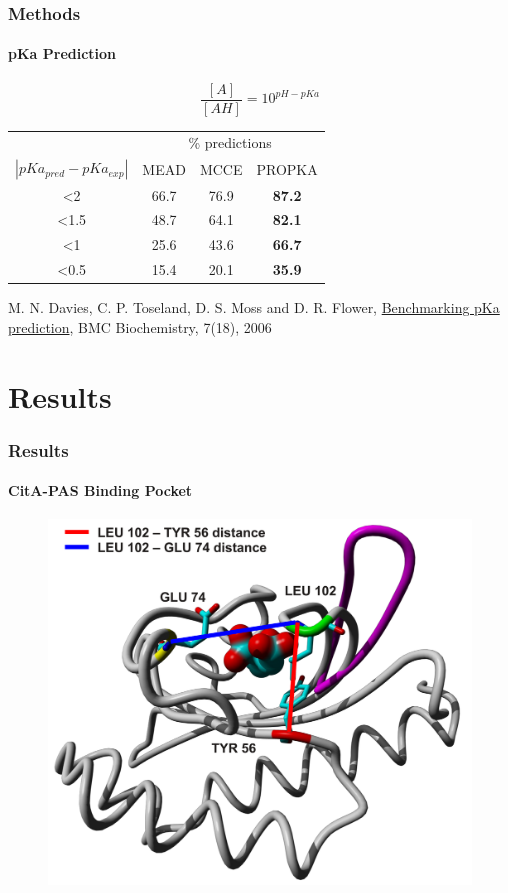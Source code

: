 \documentclass[english]{beamer}
\begin{document}
\begin{frame}
    \frametitle{Methods}
    \framesubtitle{pKa Prediction} 

    \begin{equation*}
        \frac{[A]}{[AH]} = 10^{pH - pKa}
    \end{equation*} 

    \begin{center}
    \begin{tabular}{ c c c c }
         & \multicolumn{3}{c}{\% predictions} \\
        $|pKa_{pred} - pKa_{exp}|$ & MEAD & MCCE & PROPKA \\
        \hline
        \hline
        <2   & 66.7 & 76.9 & \textbf{87.2} \\
        <1.5 & 48.7 & 64.1 & \textbf{82.1} \\
        <1   & 25.6 & 43.6 & \textbf{66.7} \\
        <0.5 & 15.4 & 20.1 & \textbf{35.9} \\
    \end{tabular}
    \end{center}

    \tiny
    M. N. Davies, C. P. Toseland, D. S. Moss and D. R. Flower,
    \href{http://www.biomedcentral.com/1471-2091/7/18/}
    {Benchmarking pKa prediction},
    BMC Biochemistry, 7(18), 2006

\end{frame}
 
 

\section{Results}

\begin{frame}
    \frametitle{Results}
    \framesubtitle{CitA-PAS Binding Pocket}

    \begin{figure}
        \includegraphics[width=.7\linewidth]{figures/CitA_pocket2.pdf}
    \end{figure}     
\end{frame}    
\end{document}
